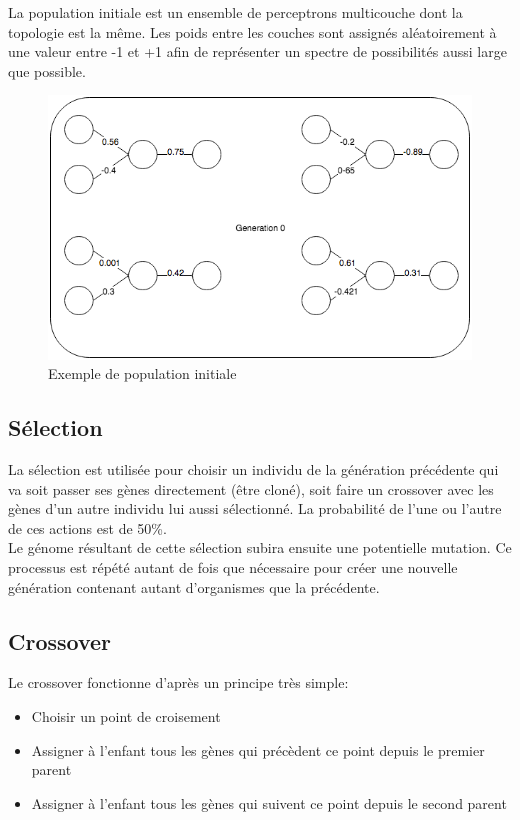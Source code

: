 \documentclass{article}
\begin{document}
La population initiale est un ensemble de perceptrons multicouche dont la topologie est la même. Les poids entre les couches sont assignés aléatoirement à une valeur entre -1 et +1 afin de représenter un spectre de possibilités aussi large que possible.
\begin{figure}[H]
\begin{center}
	\includegraphics[scale=0.6]{gen0mlp.png} 
	\caption{Exemple de population initiale}
\end{center}
\end{figure}

\subsection{Sélection}

La sélection est utilisée pour choisir un individu de la génération précédente qui va soit passer ses gènes directement (être cloné), soit faire un crossover avec les gènes d'un autre individu lui aussi sélectionné. La probabilité de l'une ou l'autre de ces actions est de 50\%.\\
Le génome résultant de cette sélection subira ensuite une potentielle mutation. Ce processus est répété autant de fois que nécessaire pour créer une nouvelle génération contenant autant d'organismes que la précédente.

\subsection{Crossover}

Le crossover fonctionne d'après un principe très simple:\\
\begin{itemize}
\item Choisir un point de croisement
\item Assigner à l'enfant tous les gènes qui précèdent ce point depuis le premier parent
\item Assigner à l'enfant tous les gènes qui suivent ce point depuis le second parent
\end{itemize}
\end{document}
